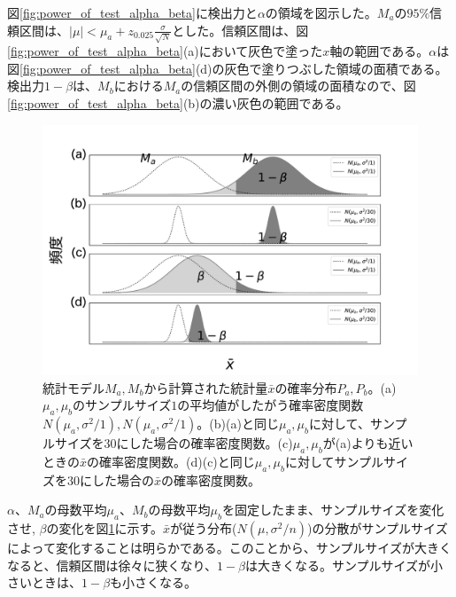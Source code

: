 図\ref{fig:power_of_test_alpha_beta}に検出力と$\alpha$の領域を図示した。$M_a$の$95\%$信頼区間は、$|\mu|<\mu_a+z_{0.025}\frac{\sigma}{\sqrt{N}}$とした。信頼区間は、図\ref{fig:power_of_test_alpha_beta}(a)において灰色で塗った$x$軸の範囲である。$\alpha$は図\ref{fig:power_of_test_alpha_beta}(d)の灰色で塗りつぶした領域の面積である。
検出力$1-\beta$は、$M_b$における$M_a$の信頼区間の外側の領域の面積なので、図\ref{fig:power_of_test_alpha_beta}(b)の濃い灰色の範囲である。



\begin{figure}
    \begin{center}
        \includegraphics[width=15cm]{./image/04_/power_of_a_test_3.pdf}
        \caption{統計モデル$M_a,M_b$から計算された統計量$\bar{x}$の確率分布$P_a,P_b$。(a)$\mu_a,\mu_b$のサンプルサイズ$1$の平均値がしたがう確率密度関数$N(\mu_a,\sigma^2/1),N(\mu_a,\sigma^2/1)$。(b)(a)と同じ$\mu_a,\mu_b$に対して、サンプルサイズを$30$にした場合の確率密度関数。(c)$\mu_a,\mu_b$が(a)よりも近いときの$\bar{x}$の確率密度関数。(d)(c)と同じ$\mu_a,\mu_b$に対してサンプルサイズを$30$にした場合の$\bar{x}$の確率密度関数。}
        \label{fig:power_of_test_alpha_beta_sample_size}
    \end{center}
    \end{figure}

    

$\alpha$、$M_a$の母数平均$\mu_a$、$M_b$の母数平均$\mu_b$を固定したまま、サンプルサイズを変化させ,
$\beta$の変化を図\ref{fig:power_of_test_alpha_beta_sample_size}に示す。$\bar{x}$が従う分布($N(\mu,\sigma^2/n)$)の分散がサンプルサイズによって変化することは明らかである。このことから、サンプルサイズが大きくなると、信頼区間は徐々に狭くなり、$1-\beta$は大きくなる。サンプルサイズが小さいときは、$1-\beta$も小さくなる。

